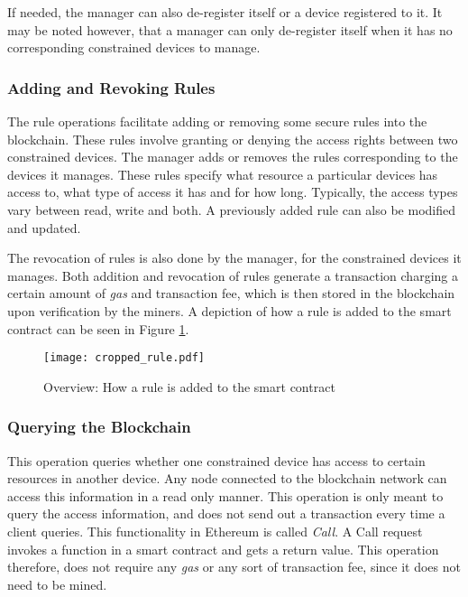 \documentclass[english]{tktltiki}
\begin{document}
If needed, the manager can also de-register itself or a device registered to it. It may be noted however, that a manager can only de-register itself when it has no corresponding constrained devices to manage.

\subsubsection*{Adding and Revoking Rules}
The rule operations facilitate adding or removing some secure rules into the blockchain. These rules involve granting or denying the access rights between two constrained devices. The manager adds or removes the rules corresponding to the devices it manages. These rules specify what resource a particular devices has access to, what type of access it has and for how long. Typically, the access types vary between read, write and both. A previously added rule can also be modified and updated. 

The revocation of rules is also done by the manager, for the constrained devices it manages. Both addition and revocation of rules generate a transaction charging a certain amount of \textit{gas} and transaction fee, which is then stored in the blockchain upon verification by the miners. A depiction of how a rule is added to the smart contract can be seen in Figure \ref{rule}. \newline

\begin{figure}[H]
\begin{center}
\texttt{[image: cropped\_rule.pdf]}

\caption{Overview: How a rule is added to the smart contract}
\label{rule}
\end{center}
\end{figure}

\subsubsection*{Querying the Blockchain}
This operation queries whether one constrained device has access to certain resources in another device. Any node connected to the blockchain network can access this information in a read only manner. This operation is only meant to query the access information, and does not send out a transaction every time a client queries. This functionality in Ethereum is called \textit{Call}. A Call request invokes a function in a smart contract and gets a return value. This operation therefore, does not require any \textit{gas} or any sort of transaction fee, since it does not need to be mined.
\end{document}
